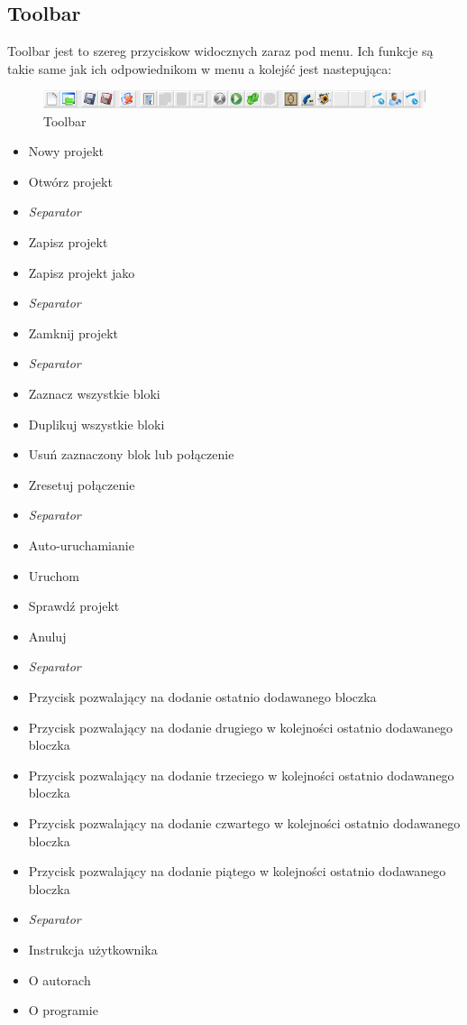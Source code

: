 \documentclass[a4paper,10pt]{article}
\begin{document}
\subsection{Toolbar}
Toolbar jest to szereg przyciskow widocznych zaraz pod menu. Ich funkcje są takie same jak ich odpowiednikom w menu a kolejść jest nastepująca:
\begin{figure}[h]
 \centering
 \includegraphics[scale=0.5]{toolbar}
 \caption{Toolbar}
 \label{fig:Toolbar}
\end{figure}
\begin{itemize}
 \item Nowy projekt
 \item Otwórz projekt
 \item \textit{Separator}
 \item Zapisz projekt
 \item Zapisz projekt jako
 \item \textit{Separator}
 \item Zamknij projekt
 \item \textit{Separator}
 \item Zaznacz wszystkie bloki
 \item Duplikuj wszystkie bloki
 \item Usuń zaznaczony blok lub połączenie
 \item Zresetuj połączenie
 \item \textit{Separator}
 \item Auto-uruchamianie
 \item Uruchom
 \item Sprawdź projekt
 \item Anuluj
 \item \textit{Separator}
 \item Przycisk pozwalający na dodanie ostatnio dodawanego bloczka
 \item Przycisk pozwalający na dodanie drugiego w kolejności ostatnio dodawanego bloczka
 \item Przycisk pozwalający na dodanie trzeciego w kolejności ostatnio dodawanego bloczka
 \item Przycisk pozwalający na dodanie czwartego w kolejności ostatnio dodawanego bloczka
 \item Przycisk pozwalający na dodanie piątego w kolejności ostatnio dodawanego bloczka
 \item \textit{Separator}
 \item Instrukcja użytkownika
 \item O autorach
 \item O programie
\end{itemize}
\end{document}
